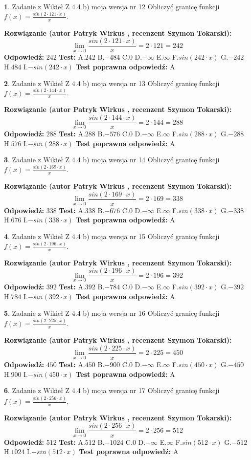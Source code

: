 \documentclass[12pt, a4paper]{article}
\theoremstyle{definition} %
\newtheorem{zad}{}
\newcommand{\zadStart}[1]{\begin{zad}#1\newline}
\newcommand{\zadStop}{\end{zad}}
\newcommand{\rozwStart}[2]{\noindent \textbf{Rozwiązanie (autor #1 , recenzent #2): }\newline}
\newcommand{\rozwStop}{\newline}
\newcommand{\odpStart}{\noindent \textbf{Odpowiedź:}\newline}
\newcommand{\odpStop}{\newline}
\newcommand{\testStart}{\noindent \textbf{Test:}\newline}
\newcommand{\testStop}{\newline}
\newcommand{\kluczStart}{\noindent \textbf{Test poprawna odpowiedź:}\newline}
\newcommand{\kluczStop}{\newline}
\begin{document}
\zadStart{Zadanie z Wikieł Z 4.4 b) moja wersja nr 12}
Obliczyć granicę funkcji $f(x)=\frac{sin(2 \cdot121\cdot x)}{x}$.
\zadStop
\rozwStart{Patryk Wirkus}{Szymon Tokarski}
$$\lim\limits_{x\to 0}\frac{sin(2 \cdot 121\cdot x)}{x}=
2 \cdot 121 = 242$$
\rozwStop
\odpStart
$242$
\odpStop
\testStart
A.$242$
B.$-484$
C.$0$
D.$-\infty$
E.$\infty$
F.$sin(242\cdot x)$
G.$-242$
H.$484$
I.$-sin(242\cdot x)$
\testStop
\kluczStart
A
\kluczStop



\zadStart{Zadanie z Wikieł Z 4.4 b) moja wersja nr 13}
Obliczyć granicę funkcji $f(x)=\frac{sin(2 \cdot144\cdot x)}{x}$.
\zadStop
\rozwStart{Patryk Wirkus}{Szymon Tokarski}
$$\lim\limits_{x\to 0}\frac{sin(2 \cdot 144\cdot x)}{x}=
2 \cdot 144 = 288$$
\rozwStop
\odpStart
$288$
\odpStop
\testStart
A.$288$
B.$-576$
C.$0$
D.$-\infty$
E.$\infty$
F.$sin(288\cdot x)$
G.$-288$
H.$576$
I.$-sin(288\cdot x)$
\testStop
\kluczStart
A
\kluczStop



\zadStart{Zadanie z Wikieł Z 4.4 b) moja wersja nr 14}
Obliczyć granicę funkcji $f(x)=\frac{sin(2 \cdot169\cdot x)}{x}$.
\zadStop
\rozwStart{Patryk Wirkus}{Szymon Tokarski}
$$\lim\limits_{x\to 0}\frac{sin(2 \cdot 169\cdot x)}{x}=
2 \cdot 169 = 338$$
\rozwStop
\odpStart
$338$
\odpStop
\testStart
A.$338$
B.$-676$
C.$0$
D.$-\infty$
E.$\infty$
F.$sin(338\cdot x)$
G.$-338$
H.$676$
I.$-sin(338\cdot x)$
\testStop
\kluczStart
A
\kluczStop



\zadStart{Zadanie z Wikieł Z 4.4 b) moja wersja nr 15}
Obliczyć granicę funkcji $f(x)=\frac{sin(2 \cdot196\cdot x)}{x}$.
\zadStop
\rozwStart{Patryk Wirkus}{Szymon Tokarski}
$$\lim\limits_{x\to 0}\frac{sin(2 \cdot 196\cdot x)}{x}=
2 \cdot 196 = 392$$
\rozwStop
\odpStart
$392$
\odpStop
\testStart
A.$392$
B.$-784$
C.$0$
D.$-\infty$
E.$\infty$
F.$sin(392\cdot x)$
G.$-392$
H.$784$
I.$-sin(392\cdot x)$
\testStop
\kluczStart
A
\kluczStop



\zadStart{Zadanie z Wikieł Z 4.4 b) moja wersja nr 16}
Obliczyć granicę funkcji $f(x)=\frac{sin(2 \cdot225\cdot x)}{x}$.
\zadStop
\rozwStart{Patryk Wirkus}{Szymon Tokarski}
$$\lim\limits_{x\to 0}\frac{sin(2 \cdot 225\cdot x)}{x}=
2 \cdot 225 = 450$$
\rozwStop
\odpStart
$450$
\odpStop
\testStart
A.$450$
B.$-900$
C.$0$
D.$-\infty$
E.$\infty$
F.$sin(450\cdot x)$
G.$-450$
H.$900$
I.$-sin(450\cdot x)$
\testStop
\kluczStart
A
\kluczStop



\zadStart{Zadanie z Wikieł Z 4.4 b) moja wersja nr 17}
Obliczyć granicę funkcji $f(x)=\frac{sin(2 \cdot256\cdot x)}{x}$.
\zadStop
\rozwStart{Patryk Wirkus}{Szymon Tokarski}
$$\lim\limits_{x\to 0}\frac{sin(2 \cdot 256\cdot x)}{x}=
2 \cdot 256 = 512$$
\rozwStop
\odpStart
$512$
\odpStop
\testStart
A.$512$
B.$-1024$
C.$0$
D.$-\infty$
E.$\infty$
F.$sin(512\cdot x)$
G.$-512$
H.$1024$
I.$-sin(512\cdot x)$
\testStop
\kluczStart
A
\kluczStop
\end{document}
